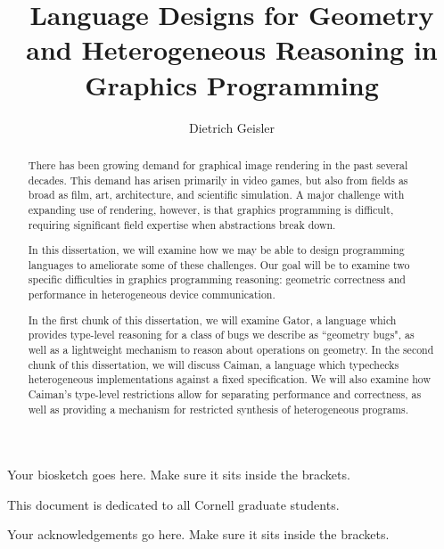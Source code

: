 \documentclass[phd,tocprelim]{cornell}
\title {Language Designs for Geometry and Heterogeneous Reasoning in Graphics Programming}
\author {Dietrich Geisler}
\begin{document}
\maketitle
\makecopyright

\mathligson

\begin{abstract}
There has been growing demand for graphical image rendering in the past several decades.  This demand has arisen primarily in video games, but also from fields as broad as film, art, architecture, and scientific simulation.  A major challenge with expanding use of rendering, however, is that graphics programming is difficult, requiring significant field expertise when abstractions break down.

In this dissertation, we will examine how we may be able to design programming languages to ameliorate some of these challenges.  Our goal will be to examine two specific difficulties in graphics programming reasoning: geometric correctness and performance in heterogeneous device communication.  

In the first chunk of this dissertation, we will examine Gator, a language which provides type-level reasoning for a class of bugs we describe as ``geometry bugs", as well as a lightweight mechanism to reason about operations on geometry.  In the second chunk of this dissertation, we will discuss Caiman, a language which typechecks heterogeneous implementations against a fixed specification.  We will also examine how Caiman's type-level restrictions allow for separating performance and correctness, as well as providing a mechanism for restricted synthesis of heterogeneous programs.
\end{abstract}

\begin{biosketch}
Your biosketch goes here. Make sure it sits inside
the brackets.
\end{biosketch}

\begin{dedication}
This document is dedicated to all Cornell graduate students.
\end{dedication}

\begin{acknowledgements}
Your acknowledgements go here. Make sure it sits inside the brackets.
\end{acknowledgements}

\contentspage
\tablelistpage
\figurelistpage

\normalspacing \setcounter{page}{1} 
\pagestyle{cornell} \addtolength{\parskip}{0.5\baselineskip}
\end{document}
